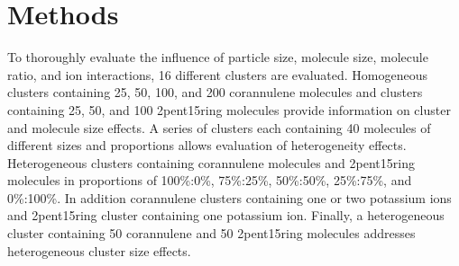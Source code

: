 






\section{Methods}
To thoroughly evaluate the influence of particle size, molecule size, molecule ratio, and ion interactions, 16 different clusters are evaluated. Homogeneous clusters containing 25, 50, 100, and 200 corannulene molecules and clusters containing 25, 50, and 100 2pent15ring molecules provide information on cluster and molecule size effects. 
A series of clusters each containing 40 molecules of different sizes and proportions allows evaluation of heterogeneity effects. Heterogeneous clusters containing corannulene molecules and 2pent15ring molecules in proportions of 100\%:0\%, 75\%:25\%, 50\%:50\%, 25\%:75\%, and 0\%:100\%. In addition corannulene clusters containing one or two potassium ions and 2pent15ring cluster containing one potassium ion. 
Finally, a heterogeneous cluster containing 50 corannulene and 50 2pent15ring molecules addresses heterogeneous cluster size effects.

